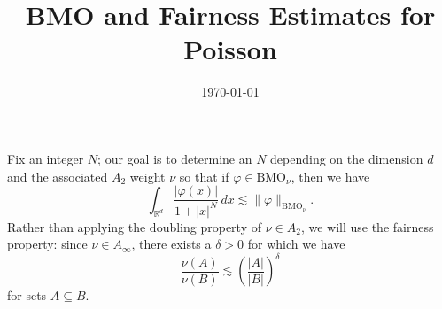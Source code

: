 \documentclass{amsart}
\title{BMO and Fairness Estimates for Poisson}
\date{\today}
\begin{document}
\maketitle
Fix an integer $N$; our goal is to determine an $N$ depending on the dimension $d$ and the associated $A_2$ weight $\nu$ so that if $\varphi \in \text{BMO}_{\nu}$, then we have
$$\int_{\mathbb{R}^d} \frac{|\varphi(x)|}{1 + |x|^N} \, dx \lesssim \|\varphi\|_{\text{BMO}_{\nu}}.$$
Rather than applying the doubling property of $\nu \in A_2$, we will use the fairness property: since $\nu \in A_{\infty}$, there exists a $\delta > 0$ for which we have
$$\frac{\nu(A)}{\nu(B)} \lesssim \left(\frac{|A|}{|B|}\right)^{\delta}$$
for sets $A \subseteq B$.
\end{document}
